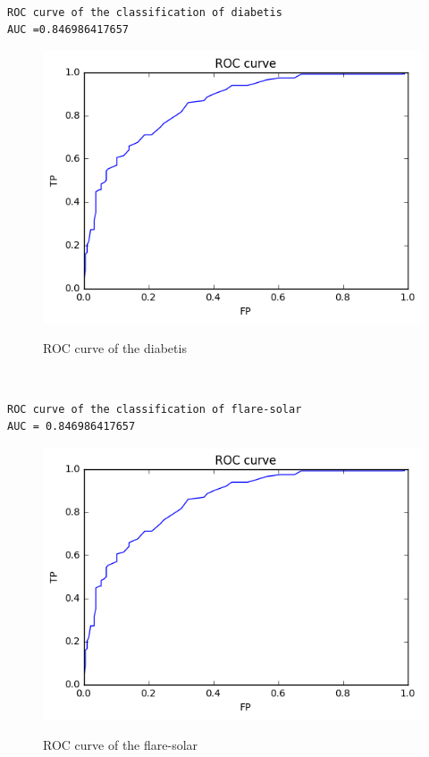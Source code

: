 \documentclass[a4paper,11pt]{article}
\begin{document}
\begin{verbatim}




\end{verbatim}

\begin{verbatim}
ROC curve of the classification of diabetis 
AUC =0.846986417657
\end{verbatim}
\begin{figure}[htbp]
 \centering 
  \includegraphics[scale=0.6]{rocdl.png}\\
    \caption{ROC curve of the diabetis}
\end{figure}

\begin{verbatim}


\end{verbatim}

\begin{verbatim}
ROC curve of the classification of flare-solar 
AUC = 0.846986417657
\end{verbatim}

\begin{figure}[htbp]
 \centering 
  \includegraphics[scale=0.6]{rocdl.png}\\
  \caption{ROC curve of the flare-solar}
\end{figure}
\end{document}
